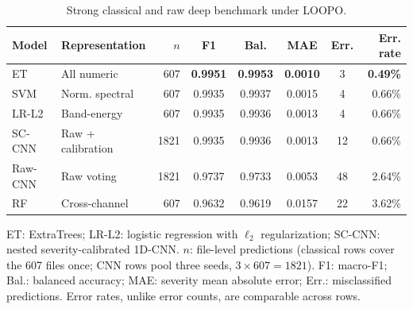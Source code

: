 \begin{table}[t]
\caption{Strong classical and raw deep benchmark under LOOPO.}
\label{tab:benchmark}
\centering
\begin{tabular}{llrccccr}
\hline
Model & Representation & $n$ & F1 & Bal. & MAE & Err. & Err. rate \\
\hline
ET      & All numeric       &  607 & \textbf{0.9951} & \textbf{0.9953} & \textbf{0.0010} &  3 & \textbf{0.49\%} \\
SVM     & Norm. spectral    &  607 & 0.9935 & 0.9937 & 0.0015 &  4 & 0.66\% \\
LR-L2   & Band-energy       &  607 & 0.9935 & 0.9936 & 0.0013 &  4 & 0.66\% \\
SC-CNN  & Raw + calibration & 1821 & 0.9935 & 0.9936 & 0.0013 & 12 & 0.66\% \\
Raw-CNN & Raw voting        & 1821 & 0.9737 & 0.9733 & 0.0053 & 48 & 2.64\% \\
RF      & Cross-channel     &  607 & 0.9632 & 0.9619 & 0.0157 & 22 & 3.62\% \\
\hline
\end{tabular}
\par\smallskip
\footnotesize ET: ExtraTrees; LR-L2: logistic regression with $\ell_2$ regularization;
SC-CNN: nested severity-calibrated 1D-CNN. $n$: file-level predictions (classical rows
cover the 607 files once; CNN rows pool three seeds, $3\times607=1821$). F1: macro-F1;
Bal.: balanced accuracy; MAE: severity mean absolute error; Err.: misclassified
predictions. Error rates, unlike error counts, are comparable across rows.
\end{table}



\caption{Experimental workbench used to acquire the public dataset: (1) 10~kW DC prime
mover; (2) 8-pole salient-pole synchronous generator analysed in this study; (3) 2-pole
cylindrical-rotor synchronous generator, not used here; (4) electromagnetic clutch;
(5) mechanical unbalance/flange systems; (6) position transducers. Only the 8-pole
salient-pole generator was used for the rotor-winding ITSC measurements analysed here.
Reproduced from [14] under the CC~BY~4.0 licence.}

